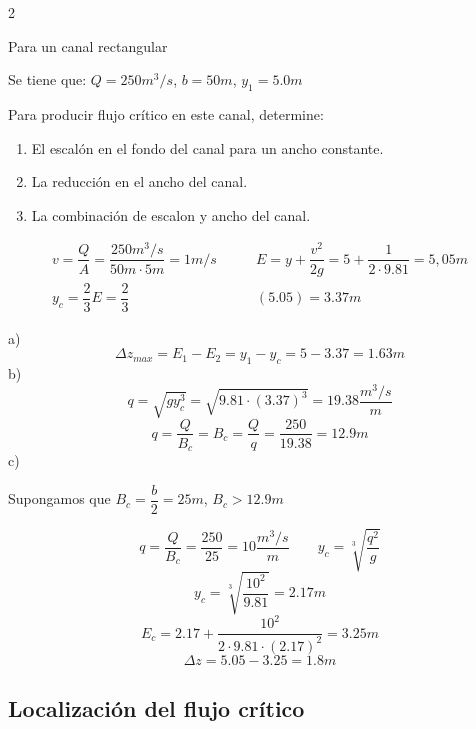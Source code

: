 \documentclass[11pt, oneside]{article}
\begin{document}
\begin{eje}{}{2}

    Para un canal rectangular \vspace{2ex}


    Se tiene que: $Q=250m^{3}/s$, $b=50m$, $y_1=5.0m$ \vspace{2ex}

    Para producir flujo crítico en este canal, determine:

    \begin{enumerate}
        \item El escalón en el fondo del canal para un ancho constante.
        \item La reducción en el ancho del canal.
        \item La combinación de escalon y ancho del canal.
    \end{enumerate}

    \begin{equation}
        \begin{aligned}
            v=\dfrac{Q}{A}=\dfrac{250 m^3/s}{50m \cdot 5m}=1m/s \qquad &E=y+\dfrac{v^{2}}{2g}=5+\dfrac{1}{2\cdot9.81}=5,05m\\
            y_{c}=\dfrac{2}{3}E=\dfrac{2}{3}&(5.05)=3.37m
        \end{aligned} 
    \nonumber
    \end{equation}

    a)  $$\Delta z_{max}=E_{1}-E_{2}=y_{1}-y_{c}=5-3.37=1.63m$$
    b)  $$q=\sqrt{gy^{3}_{c}}=\sqrt{9.81\cdot(3.37)^{3}}=19.38\dfrac{m^{3}/s}{m}$$
    $$q=\dfrac{Q}{B_{c}}=B_{c}=\dfrac{Q}{q}=\dfrac{250}{19.38}=12.9m$$
    c) \begin{center}
            Supongamos que $B_{c}=\dfrac{b}{2}=25m$, $B_{c}>12.9m$
        \end{center}
        $$q=\dfrac{Q}{B_{c}}=\dfrac{250}{25}=10\dfrac{m^{3}/s}{m} \qquad y_{c}=\sqrt[3]{\dfrac{q^{2}}{g}}$$
        $$y_{c}=\sqrt[3]{\dfrac{10^{2}}{9.81}}=2.17m$$
        $$E_{c}=2.17+\dfrac{10^{2}}{2\cdot9.81\cdot(2.17)^2}=3.25m$$
        $$\Delta z= 5.05-3.25=1.8m$$
    
    

\end{eje}

\subsection{Localización del flujo crítico}
\end{document}
